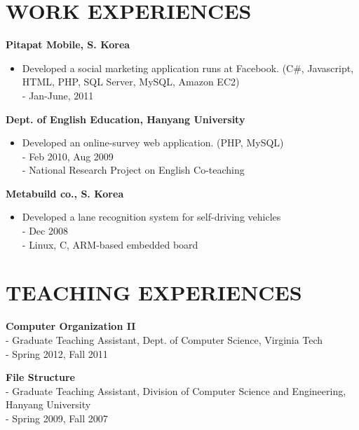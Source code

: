 \documentclass{res}
\begin{document}
\begin{resume}
\section{WORK EXPERIENCES} 
\vspace{0.1in} 
   {\bf Pitapat Mobile, S. Korea}
      \begin{itemize}
      \item[] Developed a social marketing application runs at Facebook. (C\#,
      Javascript, HTML, PHP, SQL Server, MySQL, Amazon EC2)
      \vspace{0.05in}\\
      - {\small Jan-June, 2011}
      \end{itemize}
   {\bf Dept. of English Education, Hanyang University}
      \begin{itemize}
      \item[] Developed an online-survey web application. (PHP, MySQL)
      \vspace{0.05in}\\
      - {\small Feb 2010, Aug 2009}\\
      - {\small National Research Project on English Co-teaching}
      \end{itemize}
   {\bf Metabuild co., S. Korea}
      \begin{itemize}
      \item[] Developed a lane recognition system for self-driving vehicles
      \vspace{0.05in}\\
      - {\small Dec 2008}\\
      - {\small Linux, C, ARM-based embedded board}
      \end{itemize}
 
 
\section{TEACHING EXPERIENCES} 
\vspace{0.1in} 
   {\bf Computer Organization II}
      \vspace{0.02in}\\
      - {\small Graduate Teaching Assistant, Dept. of Computer Science, Virginia
      Tech}\\
      - {\small Spring 2012, Fall 2011}

   {\bf File Structure}
      \vspace{0.02in}\\
      - {\small Graduate Teaching Assistant, Division of Computer Science and
      Engineering, Hanyang University}\\
      - {\small Spring 2009, Fall 2007}


\end{resume}
\end{document}
